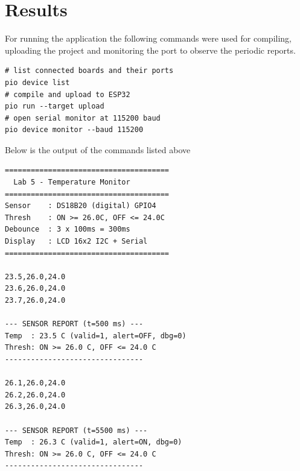 \section{Results}

For running the application the following commands were used for compiling,
uploading the project and monitoring the port to observe the periodic reports.

\begin{verbatim}
# list connected boards and their ports
pio device list
# compile and upload to ESP32
pio run --target upload
# open serial monitor at 115200 baud
pio device monitor --baud 115200
\end{verbatim}

Below is the output of the commands listed above

\begin{verbatim}
======================================
  Lab 5 - Temperature Monitor
======================================
Sensor    : DS18B20 (digital) GPIO4
Thresh    : ON >= 26.0C, OFF <= 24.0C
Debounce  : 3 x 100ms = 300ms
Display   : LCD 16x2 I2C + Serial
======================================

23.5,26.0,24.0
23.6,26.0,24.0
23.7,26.0,24.0

--- SENSOR REPORT (t=500 ms) ---
Temp  : 23.5 C (valid=1, alert=OFF, dbg=0)
Thresh: ON >= 26.0 C, OFF <= 24.0 C
--------------------------------

26.1,26.0,24.0
26.2,26.0,24.0
26.3,26.0,24.0

--- SENSOR REPORT (t=5500 ms) ---
Temp  : 26.3 C (valid=1, alert=ON, dbg=0)
Thresh: ON >= 26.0 C, OFF <= 24.0 C
--------------------------------
\end{verbatim}

